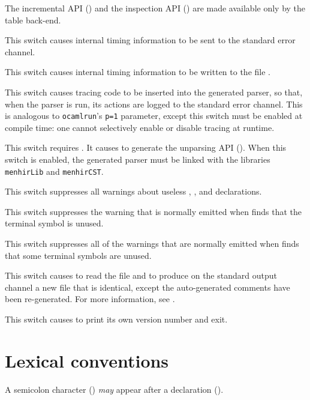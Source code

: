 \documentclass[onecolumn,11pt,nocopyrightspace,preprint]{sigplanconf}
\begin{document}
The incremental API () and the inspection API
() are made available only by the table back-end.

\docswitch{\otimings} This switch causes internal timing information to
be sent to the standard error channel.

 This switch causes internal timing
information to be written to the file .

\docswitch{\otrace} This switch causes tracing code to be inserted into
the generated parser, so that, when the parser is run, its actions are
logged to the standard error channel. This is analogous to \texttt{ocamlrun}'s
\texttt{p=1} parameter, except this switch must be enabled at compile time:
one cannot selectively enable or disable tracing at runtime.

\docswitch{\ounparsing} This switch requires \otable. It causes \menhir to
generate the unparsing API (). When this switch is
enabled, the generated parser must be linked with the libraries
\texttt{menhirLib} and \texttt{menhirCST}.

\docswitch{\oignoreprec} This switch suppresses all warnings about
useless \dleft, \dright, \dnonassoc and \dprec declarations.

 This switch suppresses the warning that
is normally emitted when \menhir finds that the terminal symbol  is
unused.

\docswitch{\oignoreall} This switch suppresses all of the warnings that are
normally emitted when \menhir finds that some terminal symbols are unused.

 This switch causes \menhir to
read the \messages file  and to produce on the standard output
channel a new \messages file that is identical, except the auto-generated
comments have been re-generated. For more information,
see .

\docswitch{\oversion} This switch causes \menhir to print its own version
number and exit.


\section{Lexical conventions}

A semicolon character (\kw{;}) \emph{may} appear after a declaration
().
\end{document}
